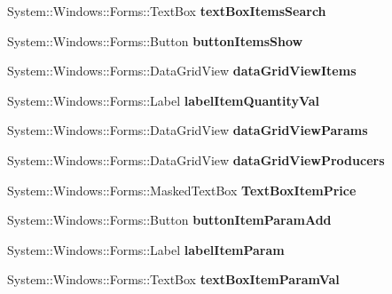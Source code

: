 \begin{DoxyCompactItemize}
System\+::\+Windows\+::\+Forms\+::\+Text\+Box {\bfseries text\+Box\+Items\+Search}
\item 
\hypertarget{class_magazyn_1_1_magazin_acc9c14079903b651e8c8af0dc13df73c}{}\label{class_magazyn_1_1_magazin_acc9c14079903b651e8c8af0dc13df73c} 
System\+::\+Windows\+::\+Forms\+::\+Button {\bfseries button\+Items\+Show}
\item 
\hypertarget{class_magazyn_1_1_magazin_adb5b20a2ce422b5d28f2af65f8c6a1b4}{}\label{class_magazyn_1_1_magazin_adb5b20a2ce422b5d28f2af65f8c6a1b4} 
System\+::\+Windows\+::\+Forms\+::\+Data\+Grid\+View {\bfseries data\+Grid\+View\+Items}
\item 
\hypertarget{class_magazyn_1_1_magazin_ac45b06c6178384a7605abc3518516b67}{}\label{class_magazyn_1_1_magazin_ac45b06c6178384a7605abc3518516b67} 
System\+::\+Windows\+::\+Forms\+::\+Label {\bfseries label\+Item\+Quantity\+Val}
\item 
\hypertarget{class_magazyn_1_1_magazin_ab7d25ba2fe9f265a72e91343318cd339}{}\label{class_magazyn_1_1_magazin_ab7d25ba2fe9f265a72e91343318cd339} 
System\+::\+Windows\+::\+Forms\+::\+Data\+Grid\+View {\bfseries data\+Grid\+View\+Params}
\item 
\hypertarget{class_magazyn_1_1_magazin_aa4af4e43030da23229c8f387f8f97bec}{}\label{class_magazyn_1_1_magazin_aa4af4e43030da23229c8f387f8f97bec} 
System\+::\+Windows\+::\+Forms\+::\+Data\+Grid\+View {\bfseries data\+Grid\+View\+Producers}
\item 
\hypertarget{class_magazyn_1_1_magazin_a1eab3748ef87458207edd2ba9942789d}{}\label{class_magazyn_1_1_magazin_a1eab3748ef87458207edd2ba9942789d} 
System\+::\+Windows\+::\+Forms\+::\+Masked\+Text\+Box {\bfseries Text\+Box\+Item\+Price}
\item 
\hypertarget{class_magazyn_1_1_magazin_a6a409880999392233c84a10d62f46840}{}\label{class_magazyn_1_1_magazin_a6a409880999392233c84a10d62f46840} 
System\+::\+Windows\+::\+Forms\+::\+Button {\bfseries button\+Item\+Param\+Add}
\item 
\hypertarget{class_magazyn_1_1_magazin_ab1982f95289d4ec62144f1b08b92973d}{}\label{class_magazyn_1_1_magazin_ab1982f95289d4ec62144f1b08b92973d} 
System\+::\+Windows\+::\+Forms\+::\+Label {\bfseries label\+Item\+Param}
\item 
\hypertarget{class_magazyn_1_1_magazin_a6532a065fbd4ba12db7417c37dde26ae}{}\label{class_magazyn_1_1_magazin_a6532a065fbd4ba12db7417c37dde26ae} 
System\+::\+Windows\+::\+Forms\+::\+Text\+Box {\bfseries text\+Box\+Item\+Param\+Val}
\item 

\end{DoxyCompactItemize}
